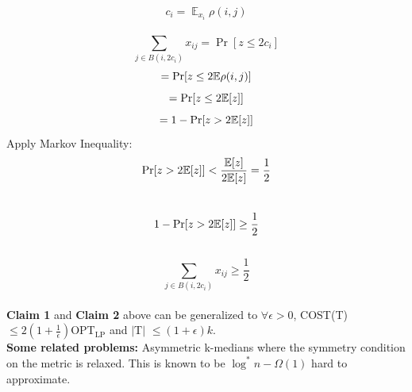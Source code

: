\noindent $$ c_i = \displaystyle \mathop{\mathbb{E}}_{x_i}\rho(i,j) $$ \\

\noindent $$ \sum\limits_{j \in B(i, 2c_i)}x_{ij} = \Pr [z\leq 2c_i] $$
$$ = \Pr [z\leq 2\mathbb{E}\rho(i,j)] $$
$$ = \Pr [z\leq 2\mathbb{E}[z]] $$
$$ = 1 - \Pr [z> 2\mathbb{E}[z]] $$ 
Apply Markov Inequality: \\

\noindent $$ \Pr [z> 2\mathbb{E}[z]] < \frac{\mathbb{E}[z]}{2\mathbb{E}[z]} = \frac{1}{2} $$ \\
$$ 1 - \Pr [z > 2\mathbb{E}[z]] \geq \frac{1}{2} $$ \\
$$ \sum\limits_{j \in B(i, 2c_i)}x_{ij} \geq \frac{1}{2} $$ \\

\noindent \textbf{Claim 1} and \textbf{Claim 2} above can be generalized to $\forall \epsilon > 0$, COST(T)$\leq2(1+\frac{1}{\epsilon})$OPT$_\text{LP}$ and $\mid $T$\mid$ $\leq (1+\epsilon)k$. \\

\noindent\textbf{Some related problems:} Asymmetric k-medians where the symmetry condition on the metric is relaxed. This is known to be $\log^*n - \Omega(1)$ hard to approximate. \\
